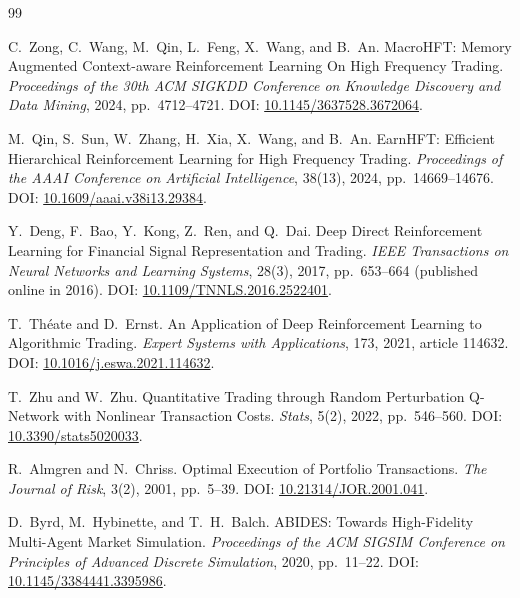 \documentclass[9pt,a4paper,twocolumn]{extarticle}
\begin{document}
\begin{thebibliography}{99}
  \setlength{\itemsep}{0.55ex}

  C.~Zong, C.~Wang, M.~Qin, L.~Feng,
  X.~Wang, and B.~An.
  \newblock
  MacroHFT: Memory Augmented Context-aware
  Reinforcement Learning On High Frequency Trading.
  \newblock
  \emph{Proceedings of the 30th ACM SIGKDD
  Conference on Knowledge Discovery and Data Mining},
  2024, pp.~4712--4721.
  \newblock
  DOI:
  \href{https://doi.org/10.1145/3637528.3672064}
  {10.1145/3637528.3672064}.

  M.~Qin, S.~Sun, W.~Zhang, H.~Xia,
  X.~Wang, and B.~An.
  \newblock
  EarnHFT: Efficient Hierarchical Reinforcement
  Learning for High Frequency Trading.
  \newblock
  \emph{Proceedings of the AAAI Conference
  on Artificial Intelligence},
  38(13), 2024, pp.~14669--14676.
  \newblock
  DOI:
  \href{https://doi.org/10.1609/aaai.v38i13.29384}
  {10.1609/aaai.v38i13.29384}.

  Y.~Deng, F.~Bao, Y.~Kong, Z.~Ren,
  and Q.~Dai.
  \newblock
  Deep Direct Reinforcement Learning for
  Financial Signal Representation and Trading.
  \newblock
  \emph{IEEE Transactions on Neural Networks
  and Learning Systems},
  28(3), 2017, pp.~653--664
  (published online in 2016).
  \newblock
  DOI:
  \href{https://doi.org/10.1109/TNNLS.2016.2522401}
  {10.1109/TNNLS.2016.2522401}.

  T.~Th\'eate and D.~Ernst.
  \newblock
  An Application of Deep Reinforcement
  Learning to Algorithmic Trading.
  \newblock
  \emph{Expert Systems with Applications},
  173, 2021, article 114632.
  \newblock
  DOI:
  \href{https://doi.org/10.1016/j.eswa.2021.114632}
  {10.1016/j.eswa.2021.114632}.

  T.~Zhu and W.~Zhu.
  \newblock
  Quantitative Trading through Random
  Perturbation Q-Network with Nonlinear
  Transaction Costs.
  \newblock
  \emph{Stats},
  5(2), 2022, pp.~546--560.
  \newblock
  DOI:
  \href{https://doi.org/10.3390/stats5020033}
  {10.3390/stats5020033}.

  R.~Almgren and N.~Chriss.
  \newblock
  Optimal Execution of Portfolio Transactions.
  \newblock
  \emph{The Journal of Risk}, 3(2), 2001,
  pp.~5--39.
  \newblock
  DOI:
  \href{https://doi.org/10.21314/JOR.2001.041}
  {10.21314/JOR.2001.041}.

  D.~Byrd, M.~Hybinette, and T.~H.~Balch.
  \newblock
  ABIDES: Towards High-Fidelity Multi-Agent
  Market Simulation.
  \newblock
  \emph{Proceedings of the ACM SIGSIM Conference
  on Principles of Advanced Discrete Simulation},
  2020, pp.~11--22.
  \newblock
  DOI:
  \href{https://doi.org/10.1145/3384441.3395986}
  {10.1145/3384441.3395986}.


\end{thebibliography}
\end{document}
